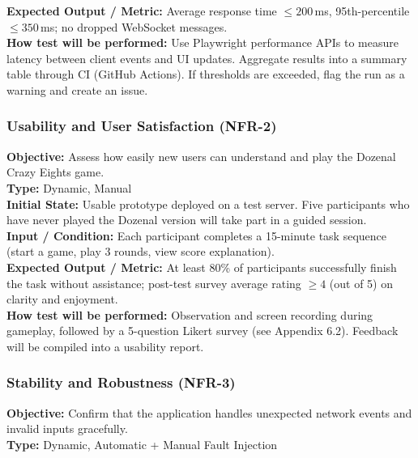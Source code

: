 \documentclass[12pt, titlepage]{article}
\begin{document}
    \textbf{Expected Output / Metric:} Average response time $\leq 200$\,ms, 95th-percentile $\leq 350$\,ms; no dropped WebSocket messages. \\

    \textbf{How test will be performed:}
    Use Playwright performance APIs to measure latency between client events and UI updates. Aggregate results into a summary table through CI (GitHub Actions).
    If thresholds are exceeded, flag the run as a warning and create an issue.

    \subsubsection{Usability and User Satisfaction (NFR-2)}
    \textbf{Objective:} Assess how easily new users can understand and play the Dozenal Crazy Eights game. \\

    \textbf{Type:} Dynamic, Manual \\

    \textbf{Initial State:} Usable prototype deployed on a test server. Five participants who have never played the Dozenal version will take part in a guided session. \\

    \textbf{Input / Condition:} Each participant completes a 15-minute task sequence (start a game, play 3 rounds, view score explanation). \\

    \textbf{Expected Output / Metric:} At least 80\% of participants successfully finish the task without assistance; post-test survey average rating $\geq 4$ (out of 5) on clarity and enjoyment. \\

    \textbf{How test will be performed:}
    Observation and screen recording during gameplay, followed by a 5-question Likert survey (see Appendix 6.2).
    Feedback will be compiled into a usability report.

    \subsubsection{Stability and Robustness (NFR-3)}
    \textbf{Objective:} Confirm that the application handles unexpected network events and invalid inputs gracefully. \\

    \textbf{Type:} Dynamic, Automatic + Manual Fault Injection \\
\end{document}
